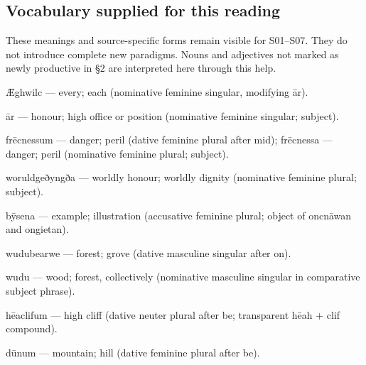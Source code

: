 \subsection*{Vocabulary supplied for this reading}

These meanings and source-specific forms remain visible for S01–S07. They do not introduce complete new paradigms. Nouns and adjectives not marked as newly productive in §2 are interpreted here through this help.

Ǣghwilc — every; each (nominative feminine singular, modifying ār).

ār — honour; high office or position (nominative feminine singular; subject).

frēcnessum — danger; peril (dative feminine plural after mid); frēcnessa — danger; peril (nominative feminine plural; subject).

woruldgeðyngða — worldly honour; worldly dignity (nominative feminine plural; subject).

bȳsena — example; illustration (accusative feminine plural; object of oncnāwan and ongietan).

wudubearwe — forest; grove (dative masculine singular after on).

wudu — wood; forest, collectively (nominative masculine singular in comparative subject phrase).

hēaclifum — high cliff (dative neuter plural after be; transparent hēah + clif compound).

dūnum — mountain; hill (dative feminine plural after be).

